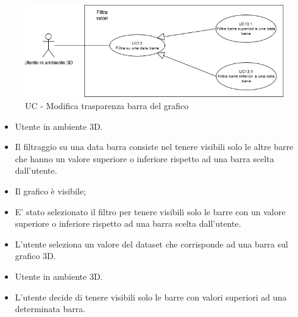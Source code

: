 \begin{figure}[h!]\centering
    \includegraphics[scale=0.7]{template/images/UC13.png}
    \caption{UC - Modifica trasparenza barra del grafico}
\end{figure}
\UCdsc
{ %
    \begin{itemize}
        \item Utente in ambiente 3D.
    \end{itemize}
}
{ %
    \begin{itemize}
        \item Il filtraggio su una data barra consiste nel tenere visibili solo le altre barre che hanno un valore superiore o inferiore rispetto ad una barra scelta dall'utente.
    \end{itemize}
}
{ %
    \begin{itemize}
        \item Il grafico è visibile;
    \end{itemize}
}
{ %
    \begin{itemize}
        \item E' stato selezionato il filtro per tenere visibili solo le barre con un valore superiore o inferiore rispetto ad una barra scelta dall'utente.
    \end{itemize}
}
{ %
    \begin{itemize}
        \item L'utente seleziona un valore del dataset che corrisponde ad una barra sul grafico 3D.
    \end{itemize}
}
\UCdsc
{ %
    \begin{itemize}
        \item Utente in ambiente 3D.
    \end{itemize}
}
{ %
    \begin{itemize}
        \item L'utente decide di tenere visibili solo le barre con valori superiori ad una determinata barra.
    \end{itemize}
}
